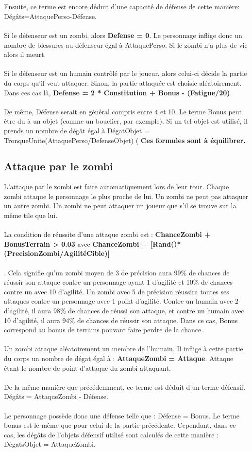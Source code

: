 \\\\
Ensuite, ce terme est encore déduit d'une capacité de défense de cette manière: Dégâts=AttaquePerso-Défense.
\\\\
Si le défenseur est un zombi, alors \textbf{Defense = 0}. Le personnage inflige donc un nombre de blessures au défenseur égal à AttaquePerso. Si le zombi n'a plus de vie alors il meurt.
\\\\
Si le défenseur est un humain contrôlé par le joueur, alors celui-ci décide la partie du corps qu'il veut attaquer. Sinon, la partie attaquée est choisie aléatoirement. Dans ces cas là, \textbf{Defense = 2 * Constitution + Bonus - (Fatigue/20)}.
\\\\
De même, Défense serait en général compris entre 4 et 10. Le terme Bonus peut être du à un objet (comme un bouclier, par exemple). Si un tel objet est utilisé, il prends un nombre de dégât égal à DégatObjet = TronqueUnite(AttaquePerso/DefenseObjet) ( \textbf{Ces formules sont à équilibrer.}
\subsection{Attaque par le zombi}
L'attaque par le zombi est faite automatiquement lors de leur tour. Chaque zombi attaque le personnage le plus proche de lui. Un zombi ne peut pas attaquer un autre zombi. Un zombi ne peut attaquer un joueur que s'il se trouve sur la même tile que lui.\\\\
La condition de réussite d'une attaque zombi est : \textbf{ChanceZombi + BonusTerrain > 0.03 }
avec \textbf{ChanceZombi = [Rand()*(PrecisionZombi/AgilitéCible)]}\\\\.
Cela signifie qu'un zombi moyen de 3 de précision aura 99\% de chances de réussir son attaque contre un personnage ayant 1 d'agilité et 10\% de chances contre un avec 10 d'agilité. Un zombi avec 5 de précision réussira toutes ses attaques contre un personnage avec 1 point d'agilité. Contre un humain avec 2 d'agilité, il aura 98\% de chances de réussi son attaque, et contre un humain avec 10 d'agilité, il aura 94\% de chances de réussir son attaque. Dans ce cas, Bonus correspond au bonus de terrains pouvant faire perdre de la chance.
\\\\
Un zombi attaque aléatoirement un membre de l'humain. Il inflige à cette partie du corps un nombre de dégat égal à : \textbf{AttaqueZombi = Attaque}. Attaque étant le nombre de point d'attaque du zombi attaquant.
\\\\
De la même manière que précédemment, ce terme est déduit d'un terme défensif. Dégâts = AttaqueZombi - Défense.
\\\\
Le personnage possède donc une défense telle que : Défense = Bonus. Le terme bonus est le même que pour celui de la partie précédente. Cependant, dans ce cas, les dégâts de l'objets défensif utilisé sont calculés de cette manière : DégatsObjet = AttaqueZombi.